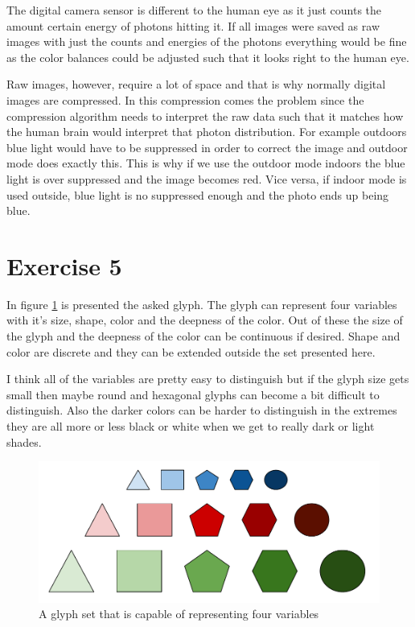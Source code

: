 \documentclass{article}
\begin{document}
The digital camera sensor is different to the human eye as it just counts the amount certain energy of photons hitting it. If all images were saved as raw images with just the counts and energies of the photons everything would be fine as the color balances could be adjusted such that it looks right to the human eye. 

Raw images, however, require a lot of space and that is why normally digital images are compressed. In this compression comes the problem since the compression algorithm needs to interpret the raw data such that it matches how the human brain would  interpret that photon distribution. For example outdoors blue light would have to be suppressed in order to correct the image and outdoor mode does exactly this. This is why if we use the outdoor mode indoors the blue light is over suppressed and the image becomes red. Vice versa, if indoor mode is used outside, blue light is no suppressed enough and the photo ends up being blue.

\section*{Exercise 5}  

In figure \ref{glyphs} is presented the asked glyph. The glyph can represent four variables with it's size, shape, color and the deepness of the color. Out of these the size of the glyph and the deepness of the color can be continuous if desired. Shape and color are discrete and they can be extended outside the set presented here. 

I think all of the variables are pretty easy to distinguish but if the glyph size gets small then maybe round and hexagonal glyphs can become a bit difficult to distinguish. Also the darker colors can be harder to distinguish in the extremes they are all more or less black or white when we get to really dark or light shades.
\begin{figure}[h!]
	\centering
	\includegraphics[width = \linewidth]{glyphs}
	\caption{A glyph set that is capable of representing four variables}
	\label{glyphs}
\end{figure}
\end{document}
